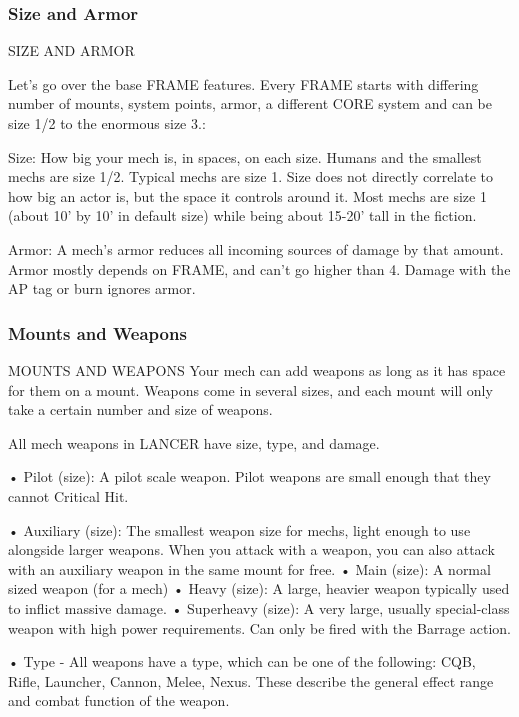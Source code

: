 \subsubsection{Size and Armor}
                                        SIZE AND ARMOR  

Let’s go over the base FRAME features. Every FRAME starts with differing number of mounts,  
system points, armor, a different CORE system and can be size 1/2 to the enormous size 3.:
 

Size: How big your mech is, in spaces, on each size. Humans and the smallest mechs are size  
1/2. Typical mechs are size 1. Size does not directly correlate to how big an actor is, but the  
space it controls around it. Most mechs are size 1 (about 10’ by 10’ in default size) while being  
about 15-20’ tall in the fiction.
 
Armor: A mech’s armor reduces all incoming sources of damage by that amount. Armor mostly  
depends on FRAME, and can’t go higher than 4. Damage with the AP tag or burn ignores armor.
 
\subsubsection{Mounts and Weapons}
                                   MOUNTS AND WEAPONS  
Your mech can add weapons as long as it has space for them on a mount. Weapons come in  
several sizes, and each mount will only take a certain number and size of weapons.
 

All mech weapons in LANCER have size, type, and damage.  

                                                                                                           


•  Pilot (size): A pilot scale weapon. Pilot weapons are small enough that they cannot Critical Hit.
 
•  Auxiliary (size): The smallest weapon size for mechs, light enough to use alongside larger  
  weapons. When you attack with a weapon, you can also attack with an auxiliary weapon in the  
  same mount for free.  
•  Main (size): A normal sized weapon (for a mech)  
•  Heavy (size): A large, heavier weapon typically used to inflict massive damage.  
•  Superheavy (size): A very large, usually special-class weapon with high power requirements.  
  Can only be fired with the Barrage action.  

•  Type - All weapons have a type, which can be one of the following: CQB, Rifle, Launcher,  
  Cannon, Melee, Nexus. These describe the general effect range and combat function of the  
  weapon.
 

